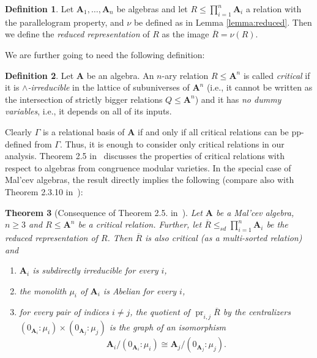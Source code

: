 \documentclass[12pt]{amsart}
\newtheorem{theorem}{Theorem}[section]
\theoremstyle{definition}
\theoremstyle{definition}
\newtheorem{definition}[theorem]{Definition}
\newcommand{\alg}[1]{\mathbf{#1}}
\newcommand{\algA}{\alg{A}}
\DeclareMathOperator{\pr}{pr}
\begin{document}
\begin{definition}
Let $\algA_1,\ldots,\algA_n$ be algebras and let $R \leq \prod_{i=1}^n \alg{A}_i$ a relation with the parallelogram property, and $\nu$ be defined as in Lemma \ref{lemma:reduced}. Then we define the \emph{reduced representation} of $R$ as the image $\overline{R} = \nu(R)$.
\end{definition}

We are further going to need the following definition:

\begin{definition}
Let $\alg{A}$ be an algebra. An $n$-ary relation $R \leq \alg{A}^n$ is called \emph{critical} if it is \emph{$\land$-irreducible} in the lattice of subuniverses of $\alg{A}^n$ (i.e., it cannot be written as the intersection of strictly bigger relations $Q \leq \alg{A}^n$) and it has \emph{no dummy variables}, i.e., it depends on all of its inputs.
\end{definition}

Clearly $\Gamma$ is a relational basis of $\alg{A}$ if and only if all critical relations can be pp-defined from $\Gamma$. Thus, it is enough to consider only critical relations in our analysis. Theorem 2.5 in~\cite{KS-parallelogramterms} discusses the properties of critical relations with respect to algebras from congruence modular varieties. In the special case of Mal'cev algebras, the result directly implies the following (compare also with Theorem 2.3.10 in~\cite{Zeb}):

\begin{theorem}[Consequence of Theorem 2.5. in~\cite{KS-parallelogramterms}] \label{teor:critical}
Let $\alg{A}$ be a Mal'cev algebra, $n\geq 3$ and $R\leq \alg{A}^n$ be a critical relation. Further, let $\overline R \leq_{sd} \prod_{i=1}^n \alg{A}_i$ be the reduced representation of $R$. Then $\overline R$ is also critical (as a multi-sorted relation) and
\begin{enumerate}
\item $\alg{A}_i$ is subdirectly irreducible for every $i$,
\item the monolith $\mu_i$ of $\alg{A}_i$ is Abelian for every $i$,
\item for every pair of indices $i\neq j$, the quotient of $\pr_{i,j} \overline R$ by the centralizers $(0_{\alg{A}_i} : \mu_i) \times (0_{\alg{A}_j} : \mu_j)$ is the graph of an isomorphism $$\alg{A}_i/(0_{\alg{A}_i} : \mu_i) \cong \alg{A}_j/(0_{\alg{A}_j} : \mu_j).$$
\end{enumerate}
\end{theorem}
\end{document}
